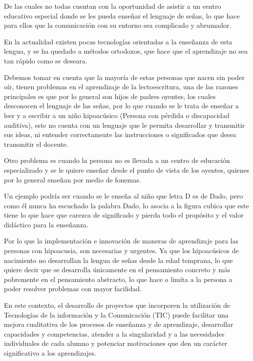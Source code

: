 \documentclass[12pt]{report}%
\begin{document}
De las cuales no todas cuentan con la oportunidad de asistir a un centro educativo especial 
\newpage 
donde se les pueda enseñar el lenguaje de señas, lo que hace para ellos que la comunicación con su entorno sea complicado y abrumador. 

En la actualidad existen pocas tecnologías orientadas a la enseñanza de esta lengua, y se ha quedado a métodos ortodoxos, que hace que el aprendizaje no sea tan rápido como se deseara. 

Debemos tomar en cuenta que la mayoría de estas personas que nacen sin poder oír, tienen problemas en el aprendizaje de la lectoescritura, una de las razones principales es que por lo general son hijos de padres oyentes, los cuales desconocen el lenguaje de las señas, por lo que cuando se le trata de enseñar a leer y a escribir a un niño hipoacúsico (Persona con pérdida o discapacidad auditiva), este no cuenta con un lenguaje que le permita desarrollar y transmitir sus ideas, ni entender correctamente las instrucciones o significados que desea transmitir el docente. 

Otro problema es cuando la persona no es llevada a un centro de educación especializado y se le quiere enseñar desde el punto de vista de los oyentes, quienes por lo general enseñan por medio de fonemas.

 Un ejemplo podría ser cuando se le enseña al niño que letra D es de Dado, pero como él nunca ha escuchado la palabra Dado, lo asocia a la figura cubica que este tiene lo que hace que carezca de significado y pierda todo el propósito y el valor didáctico para la enseñanza.
 
Por lo que la implementación e innovación de maneras de aprendizaje para las personas con hipoacusia, son necesarias y urgentes. Ya que los hipoacúsicos de nacimiento no desarrollan la lengua de señas desde la edad temprana, lo que quiere decir que se desarrolla únicamente en el pensamiento concreto y más pobremente en el pensamiento abstracto, lo que hace o limita a la persona a poder resolver problemas con mayor facilidad.  

En este contexto, el desarrollo de proyectos que incorporen la utilización de Tecnologías de la información y la Comunicación (TIC) puede facilitar una mejora cualitativa de los procesos de enseñanza y de aprendizaje, desarrollar capacidades y competencias, atender a la singularidad y a las necesidades individuales de cada alumno y potenciar motivaciones que den un carácter significativo a los aprendizajes. 
\end{document}
